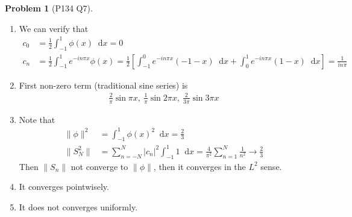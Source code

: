 \documentclass[twoside,11pt]{article}
\renewcommand*\d{\mathop{}\!\mathrm{d}}
\theoremstyle{definition}
\newtheorem{problem}{Problem}
\theoremstyle{remark}
\begin{document}
\begin{problem}[P134 Q7]\
\begin{enumerate}[label=(\alph*)]
\item We can verify that
\begin{align*}
    c_0 &= \frac{1}{2}\int_{-1}^1\phi(x)\d x = 0\\
    c_n &= \frac{1}{2}\int_{-1}^1e^{-in\pi x}\phi(x)
    = \frac{1}{2}\left[
        \int_{-1}^0 e^{-in\pi x}(-1-x)\d x
        + \int_0^1 e^{-in\pi x}(1-x)\d x
    \right] 
    = \frac{1}{in\pi}
\end{align*}

\item First non-zero term (traditional sine series) is
\begin{align*}
    \frac{2}{\pi}\sin  \pi x,\
    \frac{1}{\pi}\sin 2\pi x,\
    \frac{2}{3\pi}\sin 3\pi x
\end{align*}

\item Note that
\begin{align*}
    \|\phi\|^2 &= \int_{-1}^1\phi(x)^2\d x = \frac{2}{3}\\
    \|S_N^2\| &= \sum_{n=-N}^N |c_n|^2 \int_{-1}^1 1\d x
    = \frac{4}{\pi^2}\sum_{n=1}^N \frac{1}{n^2} \rightarrow \frac{2}{3}
\end{align*}
Then $\|S_n\|$ not converge to $\|\phi\|$, then
it converges in the $L^2$ sense.

\item It converges pointwisely.

\item It does not converges uniformly.


\end{enumerate}
\end{problem}







\end{document}
